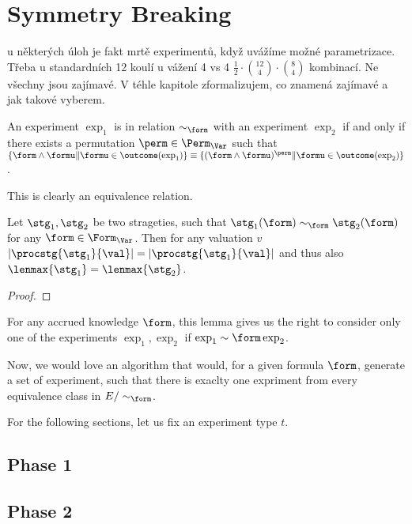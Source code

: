 \chapter{Symmetry Breaking}
 u některých úloh je fakt mrtě experimentů, když uvážíme možné
parametrizace. Třeba u standardních 12 koulí u vážení 4 vs 4
 $\frac{1}{2}\cdot {12 \choose 4}\cdot{8 \choose 4}$ kombinací. Ne všechny jsou zajímavé.
V téhle kapitole zformalizujem, co znamená zajímavé a jak takové vyberem.

\begin{definition}
An experiment $\exp_1$ is in relation $\sim_\form$ with an experiment $\exp_2$ if
 and only if there exists a permutation $\perm\in\Perm_\Var$ such that
 $ \{ \form\wedge\formu \| \formu\in\outcome(\exp_1) \} \equiv
   \{ (\form\wedge\formu)^\perm \| \formu\in\outcome(\exp_2) \} $.
\end{definition}

This is clearly an equivalence relation.

\begin{lemma}
Let $\stg_1, \stg_2$ be two strageties, such that
$\stg_1(\form) \sim_\form \stg_2(\form)$ for any $\form \in\Form_\Var$.
Then for any valuation $v$ $|\procstg{\stg_1}{\val}| = |\procstg{\stg_1}{\val}|$
and thus also $\lenmax{\stg_1} = \lenmax{\stg_2}$.
\end{lemma}

\begin{proof}
\end{proof}

For any accrued knowledge $\form$, this lemma gives us the right
to consider only one of the experiments
$\exp_1, \exp_2$ if $\exp_1 \sim\form \exp_2$.

Now, we would love an algorithm that would, for a given formula $\form$,
generate a set of experiment, such that there is exaclty one expriment
from every equivalence class in $E/\sim_\form$.

For the following sections, let us fix an experiment type $t$.
\section{Phase 1}

\section{Phase 2}